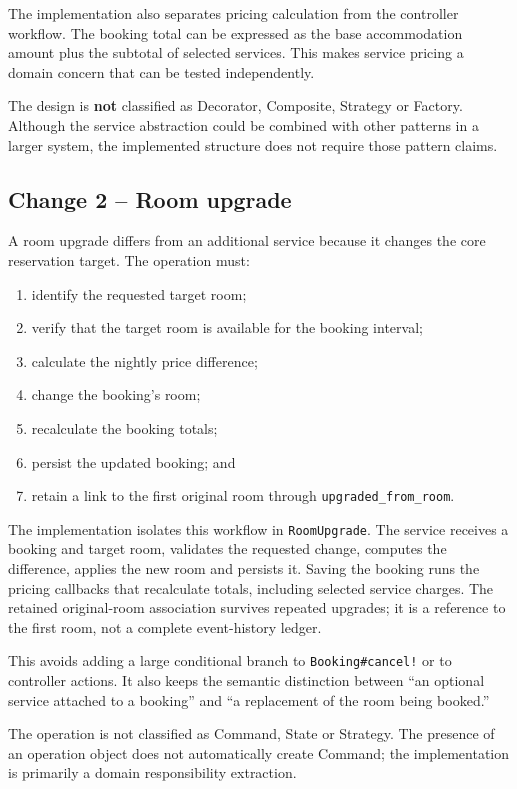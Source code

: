 \documentclass[10pt,a4paper]{article}
\newcommand{\code}[1]{\texttt{\small #1}}
\begin{document}
The implementation also separates pricing calculation from the controller workflow. The booking total can be expressed as the base accommodation amount plus the subtotal of selected services. This makes service pricing a domain concern that can be tested independently.

The design is \textbf{not} classified as Decorator, Composite, Strategy or Factory. Although the service abstraction could be combined with other patterns in a larger system, the implemented structure does not require those pattern claims.

\subsection{Change 2 -- Room upgrade}

A room upgrade differs from an additional service because it changes the core reservation target. The operation must:

\begin{enumerate}[leftmargin=*]
\item identify the requested target room;
\item verify that the target room is available for the booking interval;
\item calculate the nightly price difference;
\item change the booking's room;
\item recalculate the booking totals;
\item persist the updated booking; and
\item retain a link to the first original room through \code{upgraded\_from\_room}.
\end{enumerate}

The implementation isolates this workflow in \code{RoomUpgrade}. The service receives a booking and target room, validates the requested change, computes the difference, applies the new room and persists it. Saving the booking runs the pricing callbacks that recalculate totals, including selected service charges. The retained original-room association survives repeated upgrades; it is a reference to the first room, not a complete event-history ledger.

This avoids adding a large conditional branch to \code{Booking\#cancel!} or to controller actions. It also keeps the semantic distinction between ``an optional service attached to a booking'' and ``a replacement of the room being booked.''

The operation is not classified as Command, State or Strategy. The presence of an operation object does not automatically create Command; the implementation is primarily a domain responsibility extraction.
\end{document}
